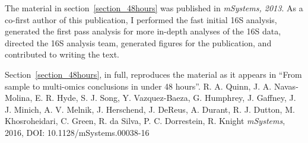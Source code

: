 \documentclass[12pt,chapterheads]{ucsd}
\begin{document}
The material in section~\ref{section_48hours} was published in \textsl{mSystems, 2013}.
As a co-first author of this publication, I performed the fast initial 16S analysis,
generated the first pass analysis for more in-depth analyses of the 16S data,
directed the 16S analysis team, generated figures for the publication, and
contributed to writing the text.

Section~\ref{section_48hours}, in full, reproduces the material as it
appears in ``From sample to multi-omics conclusions in under 48 hours''.
R. A. Quinn, J. A. Navas-Molina, E. R. Hyde, S. J. Song, Y. Vazquez-Baeza,
G. Humphrey, J. Gaffney, J. J. Minich, A. V. Melnik, J. Herschend, J. DeReus,
A. Durant, R. J. Dutton, M. Khosroheidari, C. Green, R. da Silva, P. C. Dorrestein,
R. Knight \emph{mSystems}, 2016, DOI: 10.1128/mSystems.00038-16





\appendix


\printindex %


\end{document}

